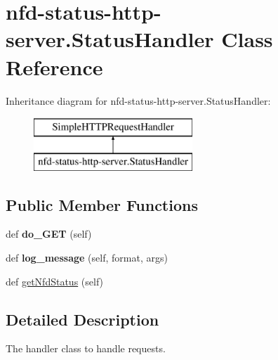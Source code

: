 \hypertarget{classnfd-status-http-server_1_1StatusHandler}{}\section{nfd-\/status-\/http-\/server.Status\+Handler Class Reference}
\label{classnfd-status-http-server_1_1StatusHandler}
Inheritance diagram for nfd-\/status-\/http-\/server.Status\+Handler\+:\begin{figure}[H]
\begin{center}
\leavevmode
\includegraphics[height=2.000000cm]{classnfd-status-http-server_1_1StatusHandler}
\end{center}
\end{figure}
\subsection*{Public Member Functions}
\begin{DoxyCompactItemize}
\item 
def {\bfseries do\+\_\+\+G\+ET} (self)\hypertarget{classnfd-status-http-server_1_1StatusHandler_a603be4e8915b2a0a0b73bc59de43e840}{}\label{classnfd-status-http-server_1_1StatusHandler_a603be4e8915b2a0a0b73bc59de43e840}

\item 
def {\bfseries log\+\_\+message} (self, format, args)\hypertarget{classnfd-status-http-server_1_1StatusHandler_abfdb2f6470a3a0267dfb88d44bf8bf75}{}\label{classnfd-status-http-server_1_1StatusHandler_abfdb2f6470a3a0267dfb88d44bf8bf75}

\item 
def \hyperlink{classnfd-status-http-server_1_1StatusHandler_a755e6f359ad057540cb660214c91e378}{get\+Nfd\+Status} (self)
\end{DoxyCompactItemize}


\subsection{Detailed Description}
\begin{DoxyVerb}The handler class to handle requests.\end{DoxyVerb}
 

